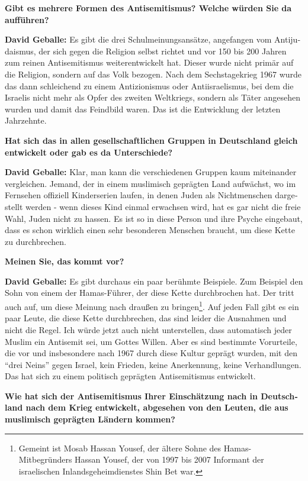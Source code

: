 \begin{otherlanguage}{ngerman}
\textbf{Gibt es mehrere Formen des Antisemitismus? Welche würden Sie da aufführen?}

\textbf{David Geballe:} Es gibt die drei Schulmeinungsansätze, angefangen vom Antijudaismus, der sich gegen die Religion selbst richtet und vor 150 bis 200 Jahren zum reinen Antisemitismus weiterentwickelt hat. Dieser wurde nicht primär auf die Religion, sondern auf das Volk bezogen. Nach dem Sechstagekrieg 1967 wurde das dann schleichend zu einem Antizionismus oder Antiisraelismus, bei dem die Israelis nicht mehr als Opfer des zweiten Weltkriegs, sondern als Täter angesehen wurden und damit das Feindbild waren. Das ist die Entwicklung der letzten Jahrzehnte. 

\textbf{Hat sich das in allen gesellschaftlichen Gruppen in Deutschland gleich entwickelt oder gab es da Unterschiede?}

\textbf{David Geballe:} Klar, man kann die verschiedenen Gruppen kaum miteinander vergleichen. Jemand, der in einem muslimisch geprägten Land aufwächst, wo im Fernsehen offiziell Kinderserien laufen, in denen Juden als Nichtmenschen dargestellt werden - wenn dieses Kind einmal erwachsen wird, hat es gar nicht die freie Wahl, Juden nicht zu hassen. Es ist so in diese Person und ihre Psyche eingebaut, dass es schon wirklich einen sehr besonderen Menschen braucht, um diese Kette zu durchbrechen. 

\textbf{Meinen Sie, das kommt vor?} 

\textbf{David Geballe:} Es gibt durchaus ein paar berühmte Beispiele. Zum Beispiel den Sohn von einem der Hamas-Führer, der diese Kette durchbrochen hat. Der tritt auch auf, um diese Meinung nach draußen zu bringen\footnote{ Gemeint ist Mosab Hassan Yousef, der ältere Sohne des Hamas-Mitbegründers Hassan Yousef, der von 1997 bis 2007 Informant der israelischen Inlandsgeheimdienstes Shin Bet war.}. Auf jeden Fall gibt es ein paar Leute, die diese Kette durchbrechen, das sind leider die Ausnahmen und nicht die Regel. Ich würde jetzt auch nicht unterstellen, dass automatisch jeder Muslim ein Antisemit sei, um Gottes Willen. Aber es sind bestimmte Vorurteile, die vor und insbesondere nach 1967 durch diese Kultur geprägt wurden, mit den "`drei Neins"' gegen Israel, kein Frieden, keine Anerkennung, keine Verhandlungen. Das hat sich zu einem politisch geprägten Antisemitismus entwickelt. 

\textbf{Wie hat sich der Antisemitismus Ihrer Einschätzung nach in Deutschland nach dem Krieg entwickelt, abgesehen von den Leuten, die aus muslimisch geprägten Ländern kommen?} 


\end{otherlanguage}
